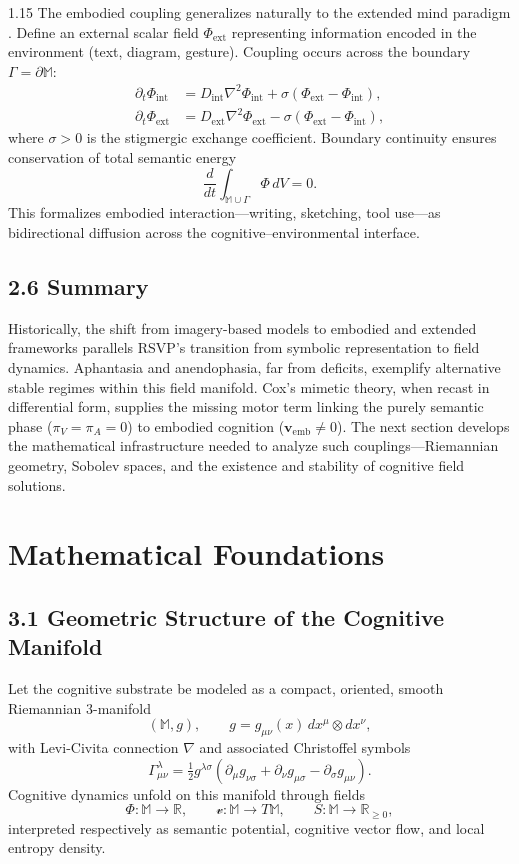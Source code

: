 \documentclass[12pt,a4paper]{article}
\begin{document}
\begin{spacing}{1.15}
The embodied coupling generalizes naturally to the extended mind paradigm \cite{clark1998}.  
Define an external scalar field \(\Phi_{\mathrm{ext}}\) representing information encoded in the environment (text, diagram, gesture).  
Coupling occurs across the boundary \(\Gamma = \partial \mathbb{M}\):
\begin{align}
\partial_t \Phi_{\mathrm{int}} &= D_{\mathrm{int}}\nabla^2 \Phi_{\mathrm{int}} + \sigma(\Phi_{\mathrm{ext}}-\Phi_{\mathrm{int}}),\\
\partial_t \Phi_{\mathrm{ext}} &= D_{\mathrm{ext}}\nabla^2 \Phi_{\mathrm{ext}} - \sigma(\Phi_{\mathrm{ext}}-\Phi_{\mathrm{int}}),
\end{align}
where \(\sigma>0\) is the stigmergic exchange coefficient.  
Boundary continuity ensures conservation of total semantic energy
\[
\frac{d}{dt} \int_{\mathbb{M}\cup\Gamma} \Phi\, dV = 0.
\]
This formalizes embodied interaction—writing, sketching, tool use—as bidirectional diffusion across the cognitive–environmental interface.

\subsection{2.6 Summary}

Historically, the shift from imagery-based models to embodied and extended frameworks parallels RSVP’s transition from symbolic representation to field dynamics.  
Aphantasia and anendophasia, far from deficits, exemplify alternative stable regimes within this field manifold.  
Cox’s mimetic theory, when recast in differential form, supplies the missing motor term linking the purely semantic phase (\(\pi_V=\pi_A=0\)) to embodied cognition (\(\boldsymbol{v}_{\mathrm{emb}}\neq0\)).  
The next section develops the mathematical infrastructure needed to analyze such couplings—Riemannian geometry, Sobolev spaces, and the existence and stability of cognitive field solutions.

\section{Mathematical Foundations}

\subsection{3.1 Geometric Structure of the Cognitive Manifold}

Let the cognitive substrate be modeled as a compact, oriented, smooth Riemannian $3$-manifold
\[
(\mathbb{M}, g), \qquad g = g_{\mu\nu}(x)\,dx^\mu\otimes dx^\nu,
\]
with Levi-Civita connection $\nabla$ and associated Christoffel symbols
\[
\Gamma^{\lambda}_{\mu\nu} = \tfrac{1}{2} g^{\lambda\sigma}
(\partial_\mu g_{\nu\sigma} + \partial_\nu g_{\mu\sigma} - \partial_\sigma g_{\mu\nu}).
\]
Cognitive dynamics unfold on this manifold through fields
\[
\Phi:\mathbb{M}\to\mathbb{R}, \qquad
\boldsymbol{\mathcal v}:\mathbb{M}\to T\mathbb{M}, \qquad
S:\mathbb{M}\to\mathbb{R}_{\ge0},
\]
interpreted respectively as semantic potential, cognitive vector flow, and local entropy density.


\end{spacing}
\end{document}
